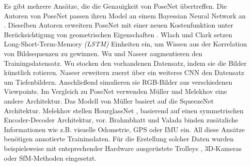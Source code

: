 Es gibt mehrere Ansätze, die die Genauigkeit von PoseNet übertreffen.
Die Autoren von PoseNet passen ihren Model an einem Bayessian Neural Network \cite{denkerTransformingNeuralNetOutput1991, mackayPracticalBayesianFramework1991} an \cite{kendallModellingUncertaintyDeep2015a}.
Dieselben Autoren erweitern PoseNet mit einer neuen Kostenfunktion unter Berücksichtigung von geometrischen Eigenschaften \cite{kendallGeometricLossFunctions2017}. Wlach \etal\cite{walchImagebasedLocalizationUsing2016} und Clark \etal\cite{clarkVidLocDeepSpatioTemporal2017} setzen Long-Short-Term-Memory \textit{(LSTM)} \cite{hochreiterLongShortTermMemory1997a} Einheiten ein, um Wissen aus der Korrelation von Bildsequenzen zu gewinnen. Wu \etal\cite{wuDelvingDeeperConvolutional2017} und Naseer \etal\cite{naseerDeepRegressionMonocular2017} augmentieren den Trainingsdatensatz. Wu \etal\cite{wuDelvingDeeperConvolutional2017} stocken den vorhandenen Datensatz, indem sie die Bilder künstlich rotieren. Naseer \etal\cite{naseerDeepRegressionMonocular2017} erweitern zuerst über ein weiteres CNN den Datensatz um Tiefenbildern. Anschließend simulieren sie RGB-Bilder aus verschiedenen Viewpoints. Im Vergleich zu PoseNet verwenden Müller \etal \cite{mullerSQUEEZEPOSENETIMAGEBASED2017} und Melekhov \etal\cite{melekhovImageBasedLocalizationUsing2017} eine andere Architektur. 
Das Modell von Müller \etal \cite{mullerSQUEEZEPOSENETIMAGEBASED2017} basiert auf die SqueezeNet\cite{iandolaSqueezeNetAlexNetlevelAccuracy2016} Architektur. Melekhov \etal stellen HourglassNet \cite{melekhovImageBasedLocalizationUsing2017}, basierend auf einen symmetrischen Encoder-Decoder Architektur, vor. Brahmbhatt \etal\cite{brahmbhattGeometryAwareLearningMaps2018} und Valada \etal\cite{valadaDeepAuxiliaryLearning2018, valadaIncorporatingSemanticGeometric} binden zusätzliche Informationen wie z.B. visuelle Odometrie, GPS oder IMU ein. 
All diese Ansätze benötigen annotierte Traininsdaten. Für die Erstellung solcher Daten wurden beispielsweise mit entsprechender Hardware ausgerüstete Trolleys \cite{huitlTUMindoorExtensiveImage2012}, 3D-Kameras \cite{izadiKinectFusionRealtime3D2011} oder SfM-Methoden \cite{kendallPoseNetConvolutionalNetwork2015} eingesetzt.

